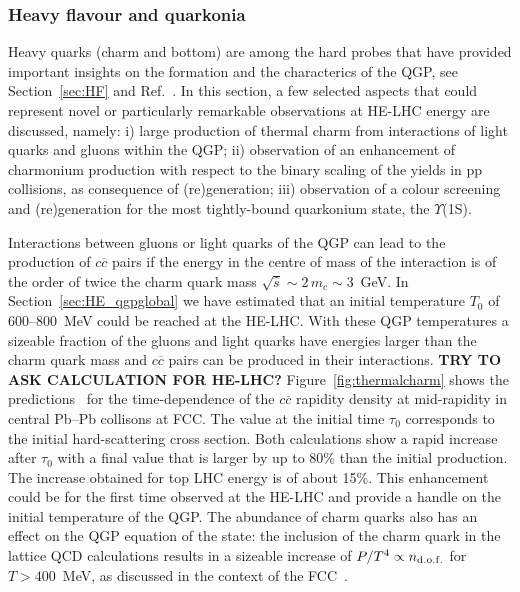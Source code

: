 \documentclass[../report.tex]{subfiles}
\begin{document}
\subsubsection{Heavy flavour and quarkonia}
\label{sec:HE_hf}


Heavy quarks (charm and bottom) are among the hard probes that have
provided important insights on the formation and the characterics of
the QGP, see Section~\ref{sec:HF} and Ref.~\cite{Andronic:2015wma}.
In this section,
a few selected aspects that could
represent novel or particularly remarkable observations at HE-LHC
energy are discussed,
namely: i) large production of thermal charm from
  interactions of light quarks and gluons within the QGP;
ii) observation of an enhancement of charmonium production with
  respect to the binary scaling of the yields in pp collisions, as
  consequence of (re)generation;
iii) observation of a colour screening and (re)generation for the most tightly-bound
  quarkonium state, the $\Upsilon$(1S).

Interactions between gluons or light quarks of the QGP can lead to the
production of $c\overline c$ pairs if the energy in the centre of mass 
of the interaction is of the order of twice the charm quark mass
$\sqrt{\hat s}\sim 2\,m_c\sim 3$~GeV. 
In Section~\ref{sec:HE_qgpglobal} we have estimated 
that an initial temperature $T_0$ of 600--800~MeV could be
reached at the HE-LHC. 
With these QGP temperatures a sizeable fraction of the gluons and
light quarks have energies larger than the charm quark mass 
and $c\overline c$ pairs can be produced in their interactions. 
{\bf TRY TO ASK CALCULATION FOR HE-LHC?} Figure~\ref{fig:thermalcharm} shows the predictions~\cite{Liu:2016zle,Zhou:2016wbo} for the time-dependence of the $c\overline c$
rapidity density at mid-rapidity in central Pb--Pb collisons at FCC. The value at the initial time
$\tau_0$ corresponds to the initial hard-scattering cross section.
Both calculations show a rapid increase
after $\tau_0$ with a final value that is larger by up to 80\% than
the initial production. The increase obtained for top LHC energy 
is of about 15\%.
This enhancement could be for the first time observed at the HE-LHC
and provide a handle on the initial
temperature of the QGP. 
The abundance of charm quarks also has an effect on the QGP equation
of the state: 
the inclusion of the charm quark in the lattice QCD calculations results in a sizeable 
increase of $P/T^4 \propto n_{\rm d.o.f.}$ for $T>400$~MeV, as
discussed in the context of the FCC~\cite{Dainese:2016gch}.  
\end{document}
